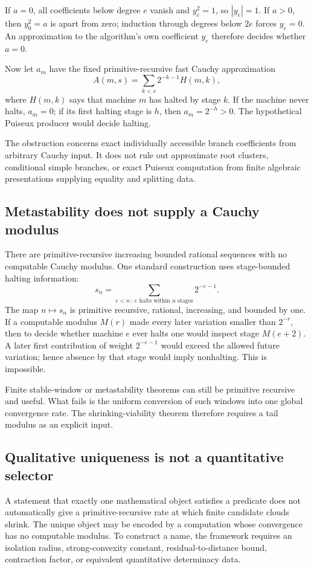 If \(a=0\), all coefficients below degree \(e\) vanish and
\(y_e^2=1\), so \(|y_e|=1\).  If \(a>0\), then \(y_0^2=a\) is apart from zero;
induction through degrees below \(2e\) forces \(y_e=0\).  An approximation to
the algorithm's own coefficient \(y_e\) therefore decides whether \(a=0\).

Now let \(a_m\) have the fixed primitive-recursive fast Cauchy approximation
\[
 A(m,s)=\sum_{k<s}2^{-k-1}H(m,k),
\]
where \(H(m,k)\) says that machine \(m\) has halted by stage \(k\).  If the
machine never halts, \(a_m=0\); if its first halting stage is \(h\), then
\(a_m=2^{-h}>0\).  The hypothetical Puiseux producer would decide halting.

The obstruction concerns exact individually accessible branch coefficients
from arbitrary Cauchy input.  It does not rule out approximate root clusters,
conditional simple branches, or exact Puiseux computation from finite
algebraic presentations supplying equality and splitting data.

\subsection{Metastability does not supply a Cauchy modulus}

There are primitive-recursive increasing bounded rational sequences with no
computable Cauchy modulus.  One standard construction uses stage-bounded
halting information:
\[
 s_n=\sum_{e<n\,:\,e\text{ halts within }n\text{ stages}}2^{-e-1}.
\]
The map \(n\mapsto s_n\) is primitive recursive, rational, increasing, and
bounded by one.  If a computable modulus \(M(r)\) made every later variation
smaller than \(2^{-r}\), then to decide whether machine \(e\) ever halts one
would inspect stage \(M(e+2)\).  A later first contribution of weight
\(2^{-e-1}\) would exceed the allowed future variation; hence absence by that
stage would imply nonhalting.  This is impossible.

Finite stable-window or metastability theorems can still be primitive
recursive and useful.  What fails is the uniform conversion of such windows
into one global convergence rate.  The shrinking-viability theorem therefore
requires a tail modulus as an explicit input.

\subsection{Qualitative uniqueness is not a quantitative selector}

A statement that exactly one mathematical object satisfies a predicate does
not automatically give a primitive-recursive rate at which finite candidate
clouds shrink.  The unique object may be encoded by a computation whose
convergence has no computable modulus.  To construct a name, the framework
requires an isolation radius, strong-convexity constant, residual-to-distance
bound, contraction factor, or equivalent quantitative determinacy data.

